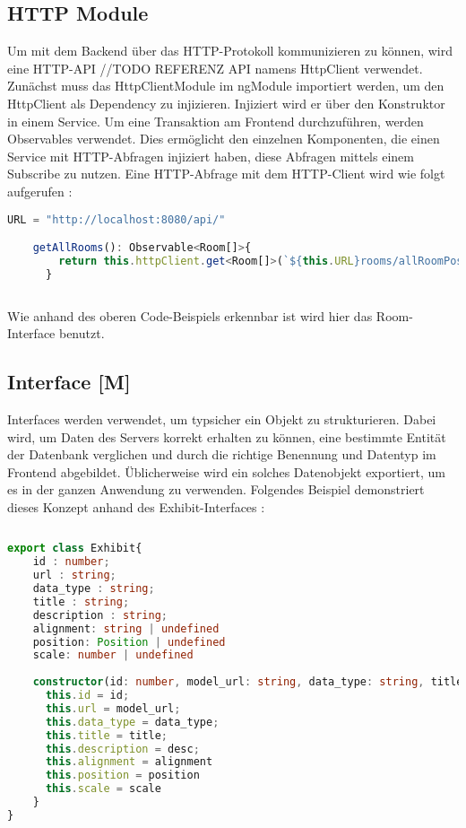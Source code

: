 \subsection{HTTP Module}
Um mit dem Backend über das HTTP-Protokoll kommunizieren zu können, wird eine HTTP-API //TODO REFERENZ API namens HttpClient verwendet. Zunächst muss das HttpClientModule im ngModule importiert werden, um den HttpClient als Dependency zu injizieren. Injiziert wird er über den Konstruktor in einem Service. Um eine Transaktion am Frontend durchzuführen, werden Observables verwendet. Dies ermöglicht den einzelnen Komponenten, die einen Service mit HTTP-Abfragen injiziert haben, diese Abfragen mittels einem Subscribe zu nutzen. Eine HTTP-Abfrage mit dem HTTP-Client wird wie folgt aufgerufen \cite{AngularBuch} \cite{AngularHTTPClient}:

\begin{lstlisting}[caption={HttpClient Abfragen},  language=TypeScript,label=lst:impl:httpclientrequests]   
    URL = "http://localhost:8080/api/"

    getAllRooms(): Observable<Room[]>{
        return this.httpClient.get<Room[]>(`${this.URL}rooms/allRoomPositions`);
      }
    
\end{lstlisting}

Wie anhand des oberen Code-Beispiels erkennbar ist wird hier das Room-Interface benutzt.

\subsection{Interface [M]}

Interfaces werden verwendet, um typsicher ein Objekt zu strukturieren. Dabei wird, um Daten des Servers korrekt erhalten zu können, eine bestimmte Entität der Datenbank verglichen und durch die richtige Benennung und Datentyp im Frontend abgebildet. Üblicherweise wird ein solches Datenobjekt exportiert, um es in der ganzen Anwendung zu verwenden. Folgendes Beispiel demonstriert dieses Konzept anhand des Exhibit-Interfaces \cite{AngularBuch}: 

\begin{lstlisting}[caption={Das Datenmodell eines Ausstelungsstückes},  language=TypeScript,label=lst:impl:httpclientrequests]   
  
export class Exhibit{
    id : number;
    url : string;
    data_type : string;
    title : string;
    description : string;
    alignment: string | undefined
    position: Position | undefined
    scale: number | undefined
  
    constructor(id: number, model_url: string, data_type: string, title: string, desc: string, alignment: string | undefined, position: Position | undefined, scale: number | undefined) {
      this.id = id;
      this.url = model_url;
      this.data_type = data_type;
      this.title = title;
      this.description = desc;
      this.alignment = alignment
      this.position = position
      this.scale = scale
    }
}
\end{lstlisting}

